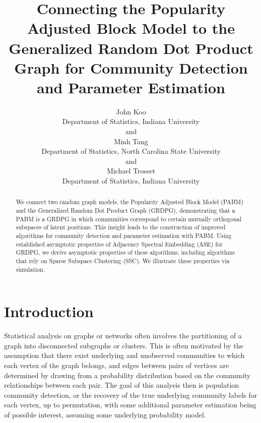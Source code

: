 \documentclass[12pt]{article}
\title{Connecting the Popularity Adjusted Block Model to the Generalized Random
Dot Product Graph for Community Detection and Parameter Estimation}
\author{John Koo\\Department of Statistics, Indiana University\\
and\\
Minh Tang\\Department of Statistics, North Carolina State University\\
and\\
Michael Trosset\\Department of Statistics, Indiana University}
\date{}
\def\spacingset#1{\renewcommand{\baselinestretch}%
{#1}\small\normalsize} \spacingset{1}
\providecommand{\tightlist}{%
  \setlength{\itemsep}{0pt}\setlength{\parskip}{0pt}}
\begin{document}
\maketitle

\begin{abstract}
We connect two random graph models, the Popularity Adjusted Block Model
(PABM) and the Generalized Random Dot Product Graph (GRDPG),
demonstrating that a PABM is a GRDPG in which communities correspond to
certain mutually orthogonal subspaces of latent positions. This insight
leads to the construction of improved algorithms for community detection
and parameter estimation with PABM. Using established asymptotic
properties of Adjacency Spectral Embedding (ASE) for GRDPG, we derive
asymptotic properties of these algorithms, including algorithms that
rely on Sparse Subspace Clustering (SSC). We illustrate these properties
via simulation.
\end{abstract}

\providecommand{\tightlist}{%
  \setlength{\itemsep}{0pt}\setlength{\parskip}{0pt}}
\newcommand{\diag}{\mathrm{diag}}
\newcommand{\tr}{\mathrm{Tr}}
\newcommand{\blockdiag}{\mathrm{blockdiag}}
\newcommand{\indep}{\stackrel{\mathrm{ind}}{\sim}}
\newcommand{\iid}{\stackrel{\mathrm{iid}}{\sim}}
\newcommand{\Bernoulli}{\mathrm{Bernoulli}}
\newcommand{\Betadist}{\mathrm{Beta}}
\newcommand{\BG}{\mathrm{BernoulliGraph}}
\newcommand{\PABM}{\mathrm{PABM}}
\newcommand{\RDPG}{\mathrm{RDPG}}
\newcommand{\GRDPG}{\mathrm{GRDPG}}
\newcommand{\Multinomial}{\mathrm{Multinomial}}
\newtheorem{theorem}{Theorem}
\newtheorem{lemma}{Lemma}
\newtheorem{proposition}{Proposition}
\theoremstyle{remark}
\newtheorem*{remark}{Remark}
\theoremstyle{definition}
\newtheorem{definition}{Definition}
\newtheorem*{example}{Example}
\newpage
\spacingset{1.5} %

\hypertarget{introduction}{%
\section{Introduction}\label{introduction}}

Statistical analysis on graphs or networks often involves the
partitioning of a graph into disconnected subgraphs or clusters. This is
often motivated by the assumption that there exist underlying and
unobserved communities to which each vertex of the graph belongs, and
edges between pairs of vertices are determined by drawing from a
probability distribution based on the community relationships between
each pair. The goal of this analysis then is population community
detection, or the recovery of the true underlying community labels for
each vertex, up to permutation, with some additional parameter
estimation being of possible interest, assuming some underlying
probability model. 
\end{document}
